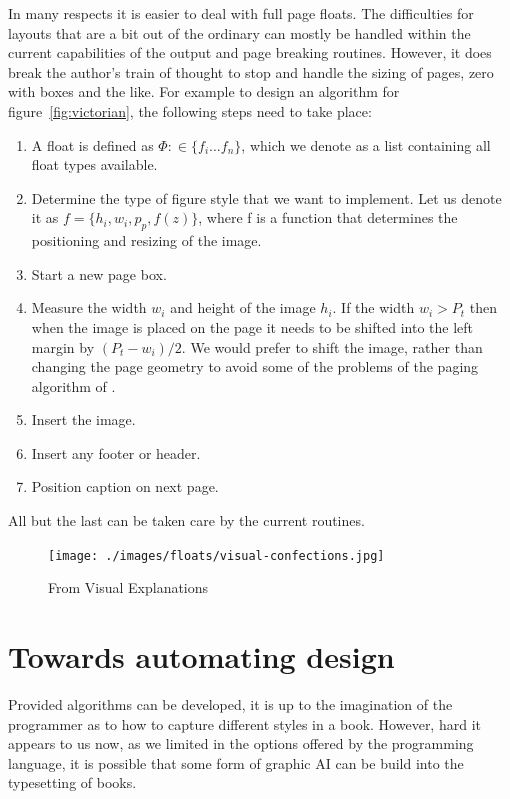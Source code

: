In many respects it is easier to deal with full page floats. The difficulties for layouts that are a bit out of the ordinary can mostly be handled within the current capabilities of the \latexe output and page breaking routines. However, it does break the author’s train of thought to stop and handle the sizing of pages, zero with boxes and the like. For example to design an algorithm for figure~\ref{fig:victorian}, the following steps need to take place:

\begin{enumerate}
\item  A float is defined as $\Phi \colon \in \{f_i\dots f_n \}$, which we denote as a list containing all float types available. 
\item Determine the type of figure style that we want to implement. Let us denote it as 
         $f = \{h_i,w_i,p_p, f(z)\}$, where f is a function that determines the positioning and resizing of the image.
\item Start a new page box.
\item Measure the width $w_i$  and height of the image $h_i$. If the width $w_i>P_t$ then when the image is placed on the page it needs to be shifted into the left margin by $(P_t-w_i)/2$. We would prefer to shift the image, rather than changing the page geometry to avoid some of the problems of the paging algorithm of \tex. 
\item Insert the image.
\item Insert any footer or header. 
\item Position caption on next page.          
\end{enumerate}

All but the last can be taken care by the current \latexe routines. 

\begin{figure}[htbp]
\texttt{[image: ./images/floats/visual-confections.jpg]}
\caption{From Visual Explanations}
\end{figure}


\section{Towards automating design}

Provided algorithms can be developed, it is up to the imagination of the programmer as to how to capture different styles in a book. However, hard it appears to us now, as we limited in the options offered by the programming language, it is possible that some form of graphic AI can be build into the typesetting of books.

